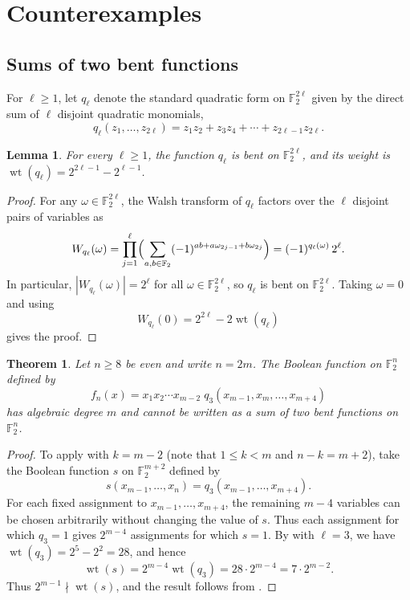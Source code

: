 \documentclass{amsart}
\numberwithin{equation}{section}
\theoremstyle{plain}
\newtheorem{theorem}[equation]{Theorem}
\newtheorem{lemma}[equation]{Lemma}
\theoremstyle{definition}
\theoremstyle{remark}
\DeclareMathOperator{\wt}{wt}
\newcommand{\F}{\mathbb{F}_2}
\begin{document}
\section{Counterexamples}
\label{sec:counterexamples}

\subsection{Sums of two bent functions}
\label{subsec:bent-sums}
For $\ell\ge1$, let $q_\ell$ denote the standard quadratic form on $\F^{2\ell}$ given by the direct sum of $\ell$ disjoint quadratic monomials,
\[
 q_\ell(z_1,\ldots,z_{2\ell})
   =z_1z_2+z_3z_4+\cdots+z_{2\ell-1}z_{2\ell}.
\]

\begin{lemma}
\label{lem:quadratic-weight}
For every $\ell\ge1$, the function $q_\ell$ is bent on $\F^{2\ell}$, and its weight is $\wt(q_\ell)=2^{2\ell-1}-2^{\ell-1}$.
\end{lemma}

\begin{proof}
For any $\omega\in\F^{2\ell}$, the Walsh transform of $q_\ell$ factors over the $\ell$ disjoint pairs of variables as
\[
 W_{q_\ell}(\omega)
 =\prod_{j=1}^\ell\Bigl(\sum_{a,b\in\F}
   (-1)^{ab+a\omega_{2j-1}+b\omega_{2j}}\Bigr)
 =(-1)^{q_\ell(\omega)}\,2^\ell.
\]
In particular, $|W_{q_\ell}(\omega)|=2^\ell$ for all $\omega\in\F^{2\ell}$, so $q_\ell$ is bent on $\F^{2\ell}$.
Taking $\omega=0$ and using
\[
 W_{q_\ell}(0)=2^{2\ell}-2\wt(q_\ell)
\]
gives the proof.
\end{proof}

\begin{theorem}
\label{thm:all-even}
Let $n\ge 8$ be even and write $n=2m$. The Boolean function on $\F^n$ defined by
\begin{equation}
 \label{eq:top-degree}
 f_n(x)
  =x_1x_2\cdots x_{m-2}\;q_3(x_{m-1},x_m,\ldots,x_{m+4})
\end{equation}
has algebraic degree $m$ and cannot be written as a sum of two bent functions on $\F^n$.
\end{theorem}

\begin{proof}
To apply  with $k=m-2$ (note that $1\le k<m$ and $n-k=m+2$), take the Boolean function $s$ on $\F^{m+2}$ defined by
\[
 s(x_{m-1},\ldots,x_n)=q_3(x_{m-1},\ldots,x_{m+4}).
\]
For each fixed assignment to $x_{m-1},\ldots,x_{m+4}$, the remaining $m-4$ variables can be chosen arbitrarily without changing the value of $s$. Thus each assignment for which $q_3=1$ gives $2^{m-4}$ assignments for which $s=1$. By  with $\ell=3$, we have $\wt(q_3)=2^5-2^2=28$, and hence
\[
 \wt(s)=2^{m-4}\wt(q_3)=28\cdot 2^{m-4}=7\cdot 2^{m-2}.
\]
Thus $2^{m-1}\nmid\wt(s)$, and the result follows from .
\end{proof}
\end{document}
